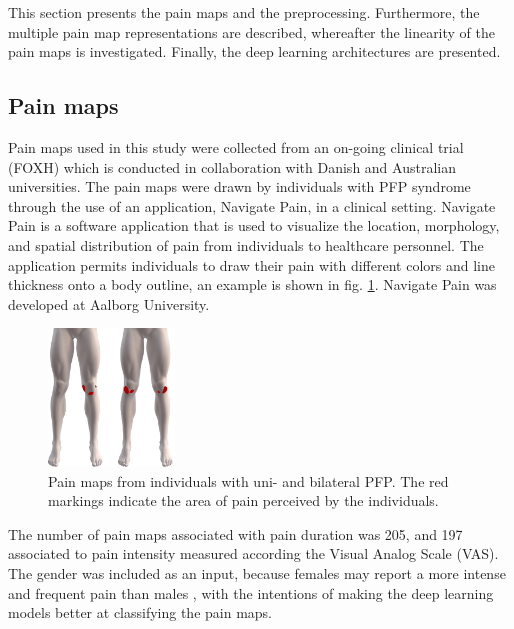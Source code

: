 This section presents the pain maps and the preprocessing. Furthermore, the multiple pain map representations are described, whereafter the linearity  of the pain maps is investigated. Finally, the deep learning architectures are presented.

\subsection*{\textbf{Pain maps}}
Pain maps used in this study were collected from an on-going clinical trial (FOXH) which is conducted in collaboration with Danish and Australian universities. The pain maps were drawn by individuals with PFP syndrome through the use of an application, Navigate Pain, in a clinical setting. \newline
\noindent
Navigate Pain is a software application that is used to visualize the location, morphology, and spatial distribution of pain from individuals to healthcare personnel. The application permits individuals to draw their pain with different colors and line thickness onto a body outline, an example is shown in fig. \ref{fig:twoPainmaps}. Navigate Pain was developed at Aalborg University.\citep{Solutions2015}

\begin{figure}[H]
\centering
\includegraphics[width=0.3\textwidth]{Figures/twoPainmaps}
\caption{Pain maps from individuals with uni- and bilateral PFP. The red markings indicate the area of pain perceived by the individuals.}
\label{fig:twoPainmaps}
\end{figure}

\noindent
The number of pain maps associated with pain duration was 205, and 197 associated to pain intensity measured according the Visual Analog Scale (VAS). The gender was included as an input, because females may report a more intense and frequent pain than males \citep{Pieh2012}, with the intentions of making the deep learning models better at classifying the pain maps.

